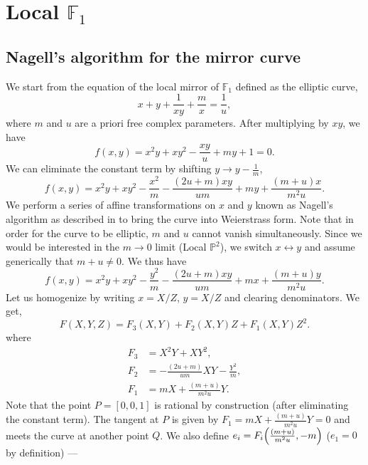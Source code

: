 \documentclass[11pt, a4paper]{article}
\numberwithin{equation}{section}
\begin{document}
\section{Local \texorpdfstring{$\mathbb{F}_1$}{F1}}


\subsection{Nagell's algorithm for the mirror curve}
We start from the equation of the local mirror of $\mathbb{F}_1$ defined as the elliptic curve,
\begin{equation}\label{eq:F1mirror}
  x + y + \frac{1}{x y} + \frac{m}{x} = \frac{1}{u},
\end{equation}
where $m$ and $u$ are a priori free complex parameters. After multiplying by $x y$, we have
\begin{equation}
  f(x, y) = x^2 y + x y^2 - \frac{x y}{u} + m y + 1 = 0.
\end{equation}
We can eliminate the constant term by shifting $y \to y - \frac{1}{m}$,
\begin{equation}
  f(x, y) = x^2 y + x y^2 - \frac{x^2}{m} - \frac{(2u + m) x y}{u m} + m y + \frac{(m + u)x}{m^2 u}.
\end{equation}
We perform a series of affine transformations on $x$ and $y$ known as Nagell's algorithm as described in \cite{ConnellHandbook} to bring the curve into Weierstrass form. Note that in order for the curve to be elliptic, $m$ and $u$ cannot vanish simultaneously. Since we would be interested in the $m \to 0$ limit (Local $\mathbb{P}^2$), we switch $x \leftrightarrow y$ and assume generically that $m + u \neq 0$. We thus have
\begin{equation}
  f(x, y) = x^2 y + x y^2 - \frac{y^2}{m} - \frac{(2u + m) x y}{u m} + m x + \frac{(m + u)y}{m^2 u}.
\end{equation}
Let us homogenize by writing $x = X/Z$, $y = X/Z$ and clearing denominators. We get,
\begin{equation}
  F(X, Y, Z) = F_3(X, Y) + F_2(X, Y) Z + F_1(X, Y) Z^2.
\end{equation}
where
\begin{align}
  F_3 &= X^2 Y + X Y^2, \\
  F_2 &= -\frac{(2u + m)}{u m} X Y - \frac{Y^2}{m}, \\
  F_1 &= m X + \frac{(m+u)}{m^2 u}  Y.
\end{align}
Note that the point $P = [0, 0, 1]$ is rational by construction (after eliminating the constant term). The tangent at $P$ is given by $F_1 = m X + \frac{(m+u)}{m^2 u} Y = 0$ and meets the curve at another point $Q$. We also define $e_i = F_i\qty(\frac{(m+u)}{m^2 u}, -m)$ ($e_1 = 0$ by definition) ---
\end{document}
